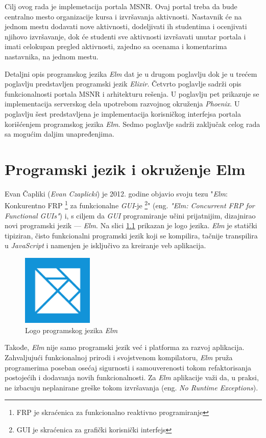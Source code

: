 \documentclass[12pt,oneside]{memoir}
\begin{document}
Cilj ovog rada je implemetacija portala MSNR.
Ovaj portal treba da bude centralno mesto organizacije kursa i izvršavanja aktivnosti.
Nastavnik će na jednom mestu dodavati nove aktivnosti, dodeljivati ih studentima i ocenjivati
njihovo izvršavanje, dok će studenti sve aktivnosti izvršavati unutar portala i imati celokupan
pregled aktivnosti, zajedno sa ocenama i komentarima nastavnika, na jednom mestu.

Detaljni opis programskog jezika \emph{Elm} dat je u drugom poglavlju dok je u trećem poglavlju predstavljen programski jezik \emph{Elixir}.
Četvrto poglavlje sadrži opis funkcionalnosti portala MSNR i arhitekturu rešenja.
U poglavlju pet prikazuje se implementacija serverskog dela upotrebom razvojnog
okruženja \emph{Phoenix}. U poglavlju šest predstavljena je implementacija korisničkog interfejsa
portala korišćenjem programskog jezika \emph{Elm}. Sedmo poglavlje sadrži zaključak celog rada sa
mogućim daljim unapređenjima.

\chapter{Programski jezik i okruženje Elm}
Evan Čapliki (\emph{Evan Czaplicki}) je 2012. godine objavio svoju tezu "\emph{Elm}: Konkurentno FRP
\footnote{FRP je skraćenica za funkcionalno reaktivno programiranje} za funkcionalne \emph{GUI}-je
\footnote{GUI je skraćenica za grafički korisnički interfejs}" (eng. \emph{"Elm: Concurrent
FRP for Functional GUIs"}) \cite{elm:2012} i, s ciljem da \emph{GUI} programiranje učini
prijatnijim, dizajnirao novi programski jezik --- \emph{Elm}. Na slici \ref{fig:elm-logo} prikazan
je logo jezika.
\emph{Elm} je statički tipiziran, čisto funkcionalni programski jezik koji se
kompilira, tačnije transpilira u \emph{JavaScript} i namenjen je isključivo za kreiranje veb aplikacija.
\begin{figure}[!ht]
  \centering
  \includegraphics[width=0.3\textwidth]{elm.png}
  \caption{Logo programskog jezika \emph{Elm}}
  \label{fig:elm-logo}
\end{figure}
Takođe, \emph{Elm} nije samo programski jezik već i platforma za razvoj aplikacija.
Zahvaljujući funkcionalnoj prirodi i svojstvenom kompilatoru, \emph{Elm} pruža programerima
poseban osećaj sigurnosti i samouverenosti tokom refaktorisanja postojećih i
dodavanja novih funkcionalnosti. Za \emph{Elm} aplikacije važi
da, u praksi, ne izbacuju neplanirane greške tokom izvršavanja (eng. \emph{No 
Runtime Exceptions}).
\end{document}
